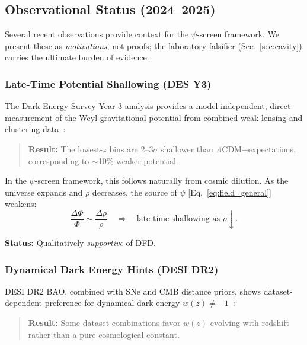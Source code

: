 

\subsection{Observational Status (2024--2025)}\label{sec:obs-status}

Several recent observations provide context for the $\psi$-screen framework. 
We present these as \textit{motivations}, not proofs; the laboratory 
falsifier (Sec.~\ref{sec:cavity}) carries the ultimate burden of evidence.

\subsubsection{Late-Time Potential Shallowing (DES Y3)}

The Dark Energy Survey Year 3 analysis provides a model-independent, direct 
measurement of the Weyl gravitational potential from combined weak-lensing 
and clustering data~\cite{DES2024Weyl}:

\begin{quote}
\textbf{Result:} The lowest-$z$ bins are 2--3$\sigma$ shallower than 
$\Lambda$CDM+\GR expectations, corresponding to $\sim$10\% weaker potential.
\end{quote}

In the $\psi$-screen framework, this follows naturally from cosmic dilution. 
As the universe expands and $\rho$ decreases, the source of $\psi$ 
[Eq.~\eqref{eq:field_general}] weakens:
\begin{equation}
\frac{\Delta\Phi}{\Phi} \sim \frac{\Delta\rho}{\rho} \quad \Rightarrow \quad 
\text{late-time shallowing as } \rho \downarrow.
\end{equation}

\textbf{Status:} Qualitatively \textit{supportive} of DFD.

\subsubsection{Dynamical Dark Energy Hints (DESI DR2)}

DESI DR2 BAO, combined with SNe and CMB distance priors, shows dataset-dependent 
preference for dynamical dark energy $w(z) \neq -1$~\cite{DESI2025DR2}:

\begin{quote}
\textbf{Result:} Some dataset combinations favor $w(z)$ evolving with redshift 
rather than a pure cosmological constant.
\end{quote}

